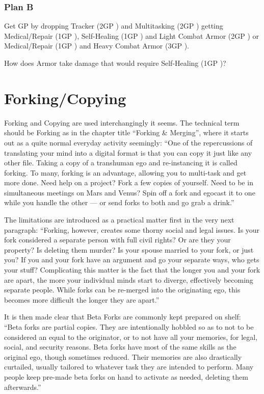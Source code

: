 \subsubsection{Plan B}

Get GP by dropping Tracker (2GP \citep[p. 326]{ep2e_1.1_2019}) and Multitasking (2GP \citep[p. 320]{ep2e_1.1_2019}) getting Medical/Repair (1GP \citep[p. 217]{ep2e_1.1_2019}), Self-Healing (1GP \citep[p. 217]{ep2e_1.1_2019}) and Light Combat Armor (2GP \citep[p. 215]{ep2e_1.1_2019}) or Medical/Repair (1GP \citep[p. 217]{ep2e_1.1_2019}) and Heavy Combat Armor (3GP \citep[p. 215]{ep2e_1.1_2019}).

How does Armor take damage that would require Self-Healing (1GP \citep[p. 217]{ep2e_1.1_2019})?


\section{Forking/Copying}

Forking and Copying are used interchangingly it seems. The technical term should be Forking as in the chapter title “Forking \& Merging”, where it starts out as a quite normal everyday activity seemingly: “One of the repercussions of translating your mind into a digital format is that you can copy it just like any other file. Taking a copy of a transhuman ego and re-instancing it is called forking. To many, forking is an advantage, allowing you to multi-task and get more done. Need help on a project? Fork a few copies of yourself. Need to be in simultaneous meetings on Mars and Venus? Spin off a fork and egocast it to one while you handle the other — or send forks to both and go grab a drink.” \citep[pg. 292]{ep2e_1.1_2019}

The limitations are introduced as a practical matter first in the very next paragraph: “Forking, however, creates some thorny social and legal issues. Is your fork considered a separate person with full civil rights? Or are they your property? Is deleting them murder? Is your spouse married to your fork, or just you? If you and your fork have an argument and go your separate ways, who gets your stuff? Complicating this matter is the fact that the longer you and your fork are apart, the more your individual minds start to diverge, effectively becoming separate people. While forks can be re-merged into the originating ego, this becomes more difficult the longer they are apart.” \citep[pg. 292]{ep2e_1.1_2019}

It is then made clear that Beta Forks are commonly kept prepared on shelf: “Beta forks are partial copies. They are intentionally hobbled so as to not to be considered an equal to the originator, or to not have all your memories, for legal, social, and security reasons. Beta forks have most of the same skills as the original ego, though sometimes reduced. Their memories are also drastically curtailed, usually tailored to whatever task they are intended to perform. Many people keep pre-made beta forks on hand to activate as needed, deleting them afterwards.” \citep[pg. 292]{ep2e_1.1_2019}

